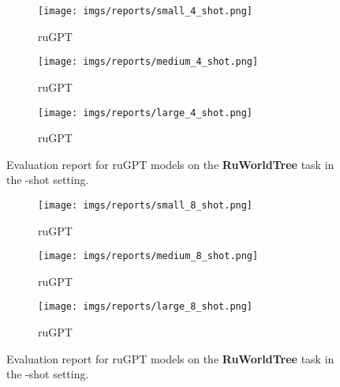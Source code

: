 \documentclass[11pt]{article}
\begin{document}
\begin{figure*}[p!]
    \centering
    \begin{subfigure}[b]{0.75\textwidth}
        \texttt{[image: imgs/reports/small\_4\_shot.png]}
        \caption{ruGPT}
    \end{subfigure}
    \begin{subfigure}[b]{0.75\textwidth}
        \texttt{[image: imgs/reports/medium\_4\_shot.png]}
        \caption{ruGPT}
    \end{subfigure}
    \begin{subfigure}[b]{0.75\textwidth}
        \texttt{[image: imgs/reports/large\_4\_shot.png]}
        \caption{ruGPT}
    \end{subfigure}
    \caption{Evaluation report for ruGPT models on the \textbf{RuWorldTree} task in the -shot setting.}
    \label{fig:report4}
\end{figure*}

\begin{figure*}[p!]
    \centering
    \begin{subfigure}[b]{0.75\textwidth}
        \texttt{[image: imgs/reports/small\_8\_shot.png]}
        \caption{ruGPT}
    \end{subfigure}
    \begin{subfigure}[b]{0.75\textwidth}
        \texttt{[image: imgs/reports/medium\_8\_shot.png]}
        \caption{ruGPT}
    \end{subfigure}
    \begin{subfigure}[b]{0.75\textwidth}
        \texttt{[image: imgs/reports/large\_8\_shot.png]}
        \caption{ruGPT}
    \end{subfigure}
    \caption{Evaluation report for ruGPT models on the \textbf{RuWorldTree} task in the -shot setting.}
    \label{fig:report8}
\end{figure*} 
\end{document}

